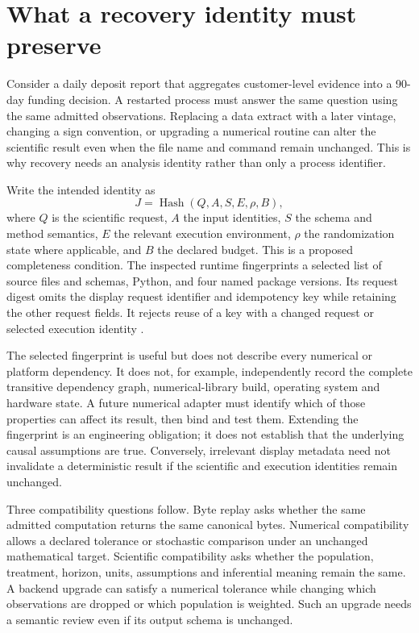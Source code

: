 \section{What a recovery identity must preserve}

Consider a daily deposit report that aggregates customer-level evidence into
a 90-day funding decision. A restarted process must answer the same question
using the same admitted observations. Replacing a data extract with a later
vintage, changing a sign convention, or upgrading a numerical routine can
alter the scientific result even when the file name and command remain
unchanged. This is why recovery needs an analysis identity rather than only
a process identifier.

Write the intended identity as
\[
 J=\operatorname{Hash}(Q,A,S,E,\rho,B),
\]
where $Q$ is the scientific request, $A$ the input identities, $S$ the schema
and method semantics, $E$ the relevant execution environment, $\rho$ the
randomization state where applicable, and $B$ the declared budget. This is a
proposed completeness condition. The inspected runtime fingerprints a selected
list of source files and schemas, Python, and four named package versions.
Its request digest omits the display request identifier and idempotency key
while retaining the other request fields. It rejects reuse of a key with a
changed request or selected execution identity
\cite{exec13_ops_source}.

The selected fingerprint is useful but does not describe every numerical or
platform dependency. It does not, for example, independently record the
complete transitive dependency graph, numerical-library build, operating
system and hardware state. A future numerical adapter must identify which
of those properties can affect its result, then bind and test them. Extending
the fingerprint is an engineering obligation; it does not establish that the
underlying causal assumptions are true. Conversely, irrelevant display
metadata need not invalidate a deterministic result if the scientific and
execution identities remain unchanged.

Three compatibility questions follow. Byte replay asks whether the same
admitted computation returns the same canonical bytes. Numerical compatibility
allows a declared tolerance or stochastic comparison under an unchanged
mathematical target. Scientific compatibility asks whether the population,
treatment, horizon, units, assumptions and inferential meaning remain the
same. A backend upgrade can satisfy a numerical tolerance while changing
which observations are dropped or which population is weighted. Such an
upgrade needs a semantic review even if its output schema is unchanged.

